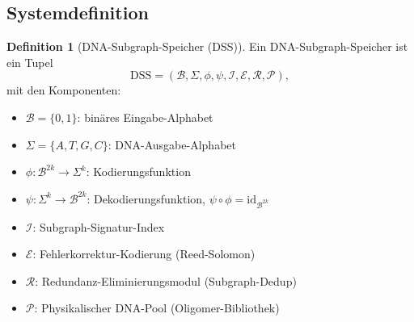 ﻿\documentclass[a4paper,12pt]{article}
\theoremstyle{definition}
\newtheorem{definition}{Definition}
\begin{document}
\subsection{Systemdefinition}

\begin{definition}[DNA-Subgraph-Speicher (DSS)]
    \label{def:dss}
    Ein DNA-Subgraph-Speicher ist ein Tupel
    \[
        \mathrm{DSS} = (\mathcal{B}, \Sigma, \phi, \psi, \mathcal{I},
                        \mathcal{E}, \mathcal{R}, \mathcal{P}),
    \]
    mit den Komponenten:
    \begin{itemize}
        \item $\mathcal{B} = \{0,1\}$: bin\"{a}res Eingabe-Alphabet
        \item $\Sigma = \{A,T,G,C\}$: DNA-Ausgabe-Alphabet
        \item $\phi: \mathcal{B}^{2k} \to \Sigma^k$: Kodierungsfunktion
        \item $\psi: \Sigma^k \to \mathcal{B}^{2k}$: Dekodierungsfunktion,
              $\psi \circ \phi = \mathrm{id}_{\mathcal{B}^{2k}}$
        \item $\mathcal{I}$: Subgraph-Signatur-Index
        \item $\mathcal{E}$: Fehlerkorrektur-Kodierung (Reed-Solomon)
        \item $\mathcal{R}$: Redundanz-Eliminierungsmodul (Subgraph-Dedup)
        \item $\mathcal{P}$: Physikalischer DNA-Pool (Oligomer-Bibliothek)
    \end{itemize}
\end{definition}
\end{document}
